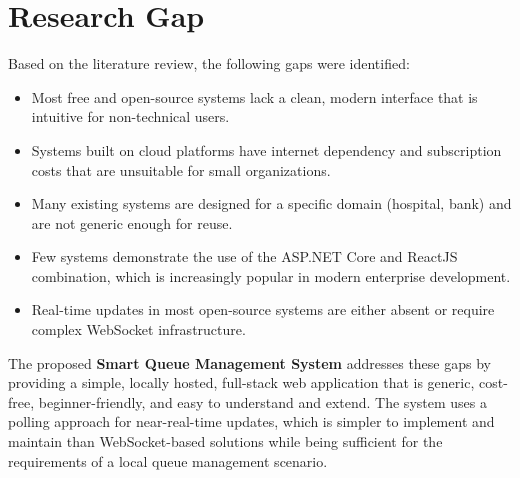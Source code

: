 \section{Research Gap}

Based on the literature review, the following gaps were identified:

\begin{itemize}
    \item Most free and open-source systems lack a clean, modern interface that is intuitive for non-technical users.
    \item Systems built on cloud platforms have internet dependency and subscription costs that are unsuitable for small organizations.
    \item Many existing systems are designed for a specific domain (hospital, bank) and are not generic enough for reuse.
    \item Few systems demonstrate the use of the ASP.NET Core and ReactJS combination, which is increasingly popular in modern enterprise development.
    \item Real-time updates in most open-source systems are either absent or require complex WebSocket infrastructure.
\end{itemize}

The proposed \textbf{Smart Queue Management System} addresses these gaps by providing a simple, locally hosted, full-stack web application that is generic, cost-free, beginner-friendly, and easy to understand and extend. The system uses a polling approach for near-real-time updates, which is simpler to implement and maintain than WebSocket-based solutions while being sufficient for the requirements of a local queue management scenario.
